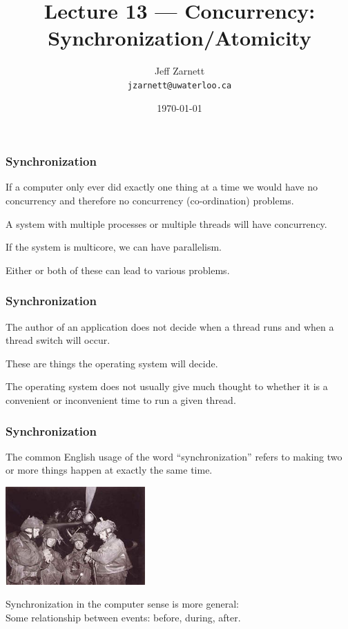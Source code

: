 

\title{Lecture 13 --- Concurrency: Synchronization/Atomicity }

\author{Jeff Zarnett \\ \small \texttt{jzarnett@uwaterloo.ca}}
\date{\today}




\begin{frame}
  \titlepage

 \end{frame}


\begin{frame}
\frametitle{Synchronization}

If a computer only ever did exactly one thing at a time we would have no concurrency and therefore no concurrency (co-ordination) problems. 

A system with multiple processes or multiple threads will have concurrency.

If the system is multicore, we can have parallelism.

Either or both of these can lead to various problems.


\end{frame}

\begin{frame}
\frametitle{Synchronization}

The author of an application does not decide when a thread runs and when a thread switch will occur. 

These are things the operating system will decide. 

The operating system does not usually give much thought to whether it is a convenient or inconvenient time to run a given thread.


\end{frame}

\begin{frame}
\frametitle{Synchronization}

The common English usage of the word ``synchronization'' refers to making two or more things happen at exactly the same time. 

\begin{center}
	\includegraphics[width=0.4\textwidth]{images/synchronize-watches.jpg}
\end{center}

Synchronization in the computer sense is more general:\\
\quad Some relationship between events: before, during, after. 

\end{frame}


